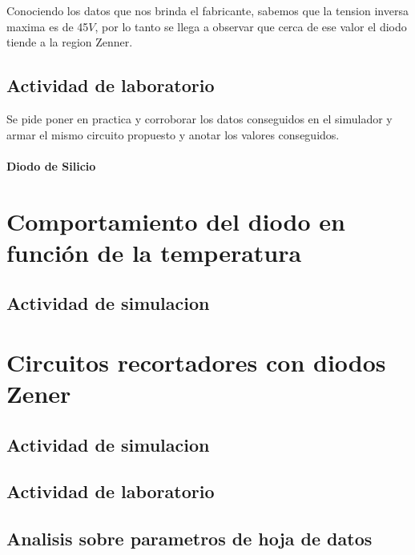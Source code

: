 \documentclass[chaptersright]{informeutn}
\begin{document}
        Conociendo los datos que nos brinda el fabricante, sabemos que la tension inversa maxima es de 45$V$, por lo
        tanto se llega a observar que cerca de ese valor el diodo tiende a la region Zenner.

  \chapter{Actividad de laboratorio}
    Se pide poner en practica y corroborar los datos conseguidos en el simulador y armar el mismo circuito
    propuesto y anotar los valores conseguidos.

      \subsection{Diodo de Silicio}

  \part{Comportamiento del diodo en función de la temperatura}
    \chapter{Actividad de simulacion}
  \part{Circuitos recortadores con diodos Zener}
    \chapter{Actividad de simulacion}
    \chapter{Actividad de laboratorio}
    \chapter{Analisis sobre parametros de hoja de datos}
\end{document}
